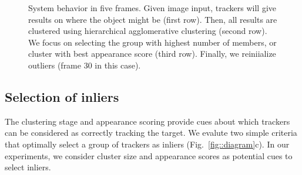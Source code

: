 \begin{figure}[t!]
\centering

    \vspace{0.15cm}


    \vspace{0.15cm}



\caption{\small System behavior in five frames. Given image input, trackers will give
results on where the object might be (first row). Then, all results are
clustered using hierarchical agglomerative clustering (second row). We focus on
selecting the group with highest number of members, or cluster with best
appearance score (third row). Finally, we reiniialize outliers
(frame 30 in this case).}   
\end{figure}

\subsection{Selection of inliers}
\label{sec:inliers}
The clustering stage and appearance scoring provide cues about which trackers
can be considered as correctly tracking the target.
We evalute two simple criteria that optimally select a group of trackers as
inliers (Fig.~\ref{fig::diagram}c).
In our experiments, we consider cluster size and appearance scores as
potential cues to select inliers.


